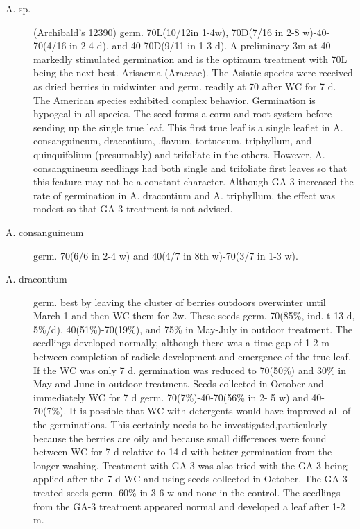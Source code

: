 \begin{description}
\item[A. sp.] (Archibald's 12390) germ. 70L(10/12in 1-4w), 70D(7/16 in 2-8 w)-40-
70(4/16 in 2-4 d), and 40-70D(9/11 in 1-3 d). A preliminary 3m at 40 markedly
stimulated germination and is the optimum treatment with 70L being the next best.
Arisaema (Araceae). The Asiatic species were received as dried berries in
midwinter and germ. readily at 70 after WC for 7 d. The American species exhibited
complex behavior. Germination is hypogeal in all species. The seed forms a corm and
root system before sending up the single true leaf. This first true leaf is a single leaflet
in A. consanguineum, dracontium, .flavum, tortuosum, triphyllum, and quinquifolium
(presumably) and trifoliate in the others. However, A. consanguineum seedlings had
both single and trifoliate first leaves so that this feature may not be a constant
character. Although GA-3 increased the rate of germination in A. dracontium and A.
triphyllum, the effect was modest so that GA-3 treatment is not advised.
\item[A. consanguineum] germ. 70(6/6 in 2-4 w) and 40(4/7 in 8th w)-70(3/7 in 1-3 w).
\item[A. dracontium] germ. best by leaving the cluster of berries outdoors overwinter
until March 1 and then WC them for 2w. These seeds germ. 70(85\%, ind. t 13 d,
5\%/d), 40(51\%)-70(19\%), and 75\% in May-July in outdoor treatment. The seedlings
developed normally, although there was a time gap of 1-2 m between completion of
radicle development and emergence of the true leaf. If the WC was only 7 d,
germination was reduced to 70(50\%) and 30\% in May and June in outdoor treatment.
Seeds collected in October and immediately WC for 7 d germ. 70(7\%)-40-70(56\% in 2-
5 w) and 40-70(7\%). It is possible that WC with detergents would have improved all of
the germinations. This certainly needs to be investigated,particularly because the
berries are oily and because small differences were found between WC for 7 d relative
to 14 d with better germination from the longer washing. Treatment with GA-3 was
also tried with the GA-3 being applied after the 7 d WC and using seeds collected in
October. The GA-3 treated seeds germ. 60\% in 3-6 w and none in the control. The
seedlings from the GA-3 treatment appeared normal and developed a leaf after 1-2 m.


\end{description}
